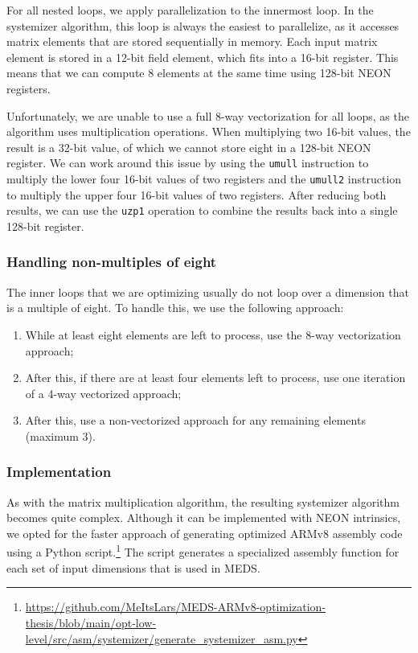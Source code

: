 \documentclass[11pt,a4paper]{report}
\theoremstyle{definition}
\begin{document}
For all nested loops, we apply parallelization to the innermost loop. In the systemizer algorithm, this loop is always the easiest to parallelize, as it accesses matrix elements that are stored sequentially in memory. Each input matrix element is stored in a 12-bit field element, which fits into a 16-bit register. This means that we can compute 8 elements at the same time using 128-bit NEON registers.

Unfortunately, we are unable to use a full 8-way vectorization for all loops, as the algorithm uses multiplication operations. When multiplying two 16-bit values, the result is a 32-bit value, of which we cannot store eight in a 128-bit NEON register. We can work around this issue by using the \texttt{umull} instruction to multiply the lower four 16-bit values of two registers and the \texttt{umull2} instruction to multiply the upper four 16-bit values of two registers. After reducing both results, we can use the \texttt{uzp1} operation to combine the results back into a single 128-bit register.

\subsubsection{Handling non-multiples of eight}
\label{sec:matrixsystemizernonmultiples}
The inner loops that we are optimizing usually do not loop over a dimension that is a multiple of eight. To handle this, we use the following approach:
\begin{enumerate}
  \item While at least eight elements are left to process, use the 8-way vectorization approach;
  \item After this, if there are at least four elements left to process, use one iteration of a 4-way vectorized approach;
  \item After this, use a non-vectorized approach for any remaining elements (maximum 3).
\end{enumerate}

\subsubsection{Implementation}
As with the matrix multiplication algorithm, the resulting systemizer algorithm becomes quite complex. Although it can be implemented with NEON intrinsics, we opted for the faster approach of generating optimized ARMv8 assembly code using a Python script.\footnote{\url{https://github.com/MeItsLars/MEDS-ARMv8-optimization-thesis/blob/main/opt-low-level/src/asm/systemizer/generate\_systemizer\_asm.py}} The script generates a specialized assembly function for each set of input dimensions that is used in MEDS.
\end{document}
